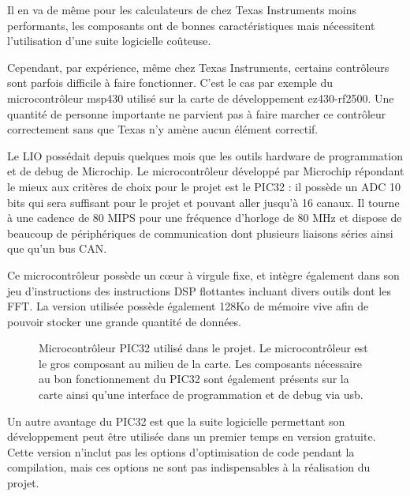 \documentclass[letterpaper, twoside, 12pt, memoire, creativecommons, hyperref]{thETS}
\begin{document}
Il en va de même pour les calculateurs de chez Texas Instruments moins performants, les composants ont de bonnes caractéristiques mais nécessitent l'utilisation d'une suite logicielle coûteuse. 

Cependant, par expérience, même chez Texas Instruments, certains contrôleurs sont parfois difficile à faire fonctionner. C'est le cas par exemple du microcontrôleur msp430 utilisé sur la carte de développement ez430-rf2500. Une quantité de personne importante ne parvient pas à faire marcher ce contrôleur correctement sans que Texas n'y amène aucun élément correctif.

Le LIO possédait depuis quelques mois que les outils hardware de programmation et de debug de Microchip. Le microcontrôleur développé par Microchip répondant le mieux aux critères de choix pour le projet est le PIC32 : il possède un ADC 10 bits qui sera suffisant pour le projet et pouvant aller jusqu’à 16 canaux. Il tourne à une cadence de 80 MIPS pour une fréquence d'horloge de 80 MHz et dispose de beaucoup de périphériques de communication dont plusieurs liaisons séries ainsi que qu’un bus CAN. 

Ce microcontrôleur possède un cœur à virgule fixe, et intègre également dans son jeu d'instructions des instructions DSP flottantes incluant divers outils dont les FFT. La version utilisée possède également 128Ko de mémoire vive afin de pouvoir stocker une grande quantité de données.

\begin{figure}
	\centering
	\caption{Microcontrôleur PIC32 utilisé dans le projet. Le microcontrôleur est le gros composant au milieu de la carte. Les composants nécessaire au bon fonctionnement du PIC32 sont également présents sur la carte ainsi qu'une interface de programmation et de debug via usb.}
	\label{fig:pic32}
\end{figure}


Un autre avantage du PIC32 est que la suite logicielle permettant son développement peut être utilisée dans un premier temps en version gratuite. Cette version n'inclut pas les options d'optimisation de code pendant la compilation, mais ces options ne sont pas indispensables à la réalisation du projet. 
\end{document}
